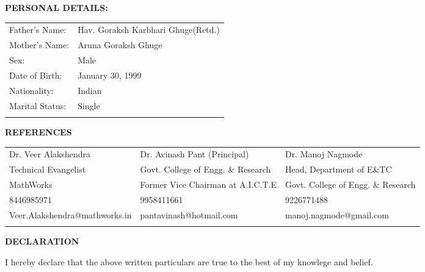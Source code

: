 \documentclass[a4paper, 10pt]{article}
\begin{document}
{\textbf{\Large{PERSONAL DETAILS:}}}\\

\begin{tabular}{ p{3cm} p{7cm} }
Father's Name: & Hav$.$ Goraksh Karbhari Ghuge(Retd.) \\ 
Mother's Name: & Aruna Goraksh Ghuge\\      
Sex: & Male \\      
Date of Birth: & January 30, 1999\\ 
Nationality: & Indian \\
Marital Status: & Single \\ 
\\
\end{tabular}

{\textbf{\Large{REFERENCES}}}\\

\begin{tabular}{ p{5cm} p{5.5cm} p{5.5cm} }
Dr$.$ Veer Alakshendra & Dr$.$ Avinash Pant (Principal) & Dr$.$ Manoj Nagmode\\ 
Technical Evangelist & Govt$.$ College of Engg$.$ \& Research & Head, Department of E\&TC \\      
MathWorks & Former Vice Chairman at A.I.C.T.E & Govt$.$ College of Engg$.$ \& Research \\      
8446985971 & 9958411661 & 9226771488 \\ 
Veer.Alakshendra@mathworks.in & pantavinash@hotmail.com & manoj.nagmode@gmail.com \\
\\
\end{tabular}

{\textbf{\Large{DECLARATION}}}\\

\centerline{I hereby declare that the above written particulars are true to the best of my knowlege and belief.}
\end{document}
